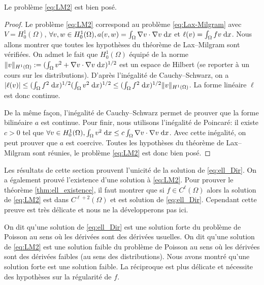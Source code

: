 \documentclass[12pt,a4paper,twoside]{article}
\begin{document}
\begin{proposition}
  Le probl\`eme \eqref{eq:LM2} est bien pos\'e.
\end{proposition}
\begin{proof}
  Le probl\`eme \eqref{eq:LM2} correspond au probl\`eme \eqref{eq:Lax-Milgram}
  avec $V = H_0^1(\Omega)$, 
  $\forall v, w \in H_0^1(\Omega), a(v,w) = \int_{\Omega} \nabla v \cdot \nabla v \;\mathrm{d} x$
  et $\ell(v) = \int_{\Omega} f v \;\mathrm{d} x$.
  Nous allons montrer que toutes les hypoth\`eses du th\'eor\`eme de Lax--Milgram
  sont v\'erifi\'ees.
  On admet le fait que $H_0^1(\Omega)$ \'equip\'e de la norme 
  $\| v \|_{H^1(\Omega)} := (\int_{\Omega} v^2 + \nabla v \cdot \nabla v \;\mathrm{d} x)^{1/2}$ 
  est un espace de Hilbert (se reporter \`a un cours sur les distributions).
  D'apr\`es l'in\'egalit\'e de Cauchy--Schwarz, on a 
  $|\ell(v)| \leq (\int_{\Omega} f^2 \;\mathrm{d} x)^{1/2} (\int_{\Omega} v^2 \;\mathrm{d} x)^{1/2}
  \leq (\int_{\Omega} f^2 \;\mathrm{d} x)^{1/2} \| v \|_{H^1(\Omega)}$.
  La forme lin\'eaire $\ell$ est donc continue. 
  
  
  De la m\^eme fa\c{c}on, l'in\'egalit\'e de Cauchy--Schwarz permet de prouver
  que la forme bilin\'eaire $a$ est continue.
  Pour finir, nous utilisons l'in\'egalit\'e de Poincar\'e: il existe $c>0$
  tel que $\forall v \in H_0^1(\Omega), 
  \int_{\Omega} v^2 \;\mathrm{d} x \leq c \int_{\Omega} \nabla v \cdot \nabla v \;\mathrm{d} x$.
  Avec cette in\'egalit\'e, on peut prouver que $a$ est coercive.
  Toutes les hypoth\`eses du th\'eor\`eme de Lax--Milgram sont r\'eunies,
  le probl\`eme \eqref{eq:LM2} est donc bien pos\'e.
\end{proof}

\begin{remark}
  Les r\'esultats de cette section prouvent l'unicit\'e de la solution
  de \eqref{eq:ell_Dir}. On a \'egalement prouv\'e l'existence d'une
  solution \`a \eqref{eq:LM2}. Pour prouver le th\'eor\`eme
  \ref{thm:ell_existence}, il faut montrer que si $f \in C^{\ell}(\Omega)$
  alors la solution de \eqref{eq:LM2} est dans $C^{\ell+2}(\Omega)$
  et est solution de \eqref{eq:ell_Dir}. Cependant cette preuve est 
  tr\`es d\'elicate et nous ne la d\'evelopperons pas ici.
\end{remark}


\begin{remark}
  On dit qu'une solution de \eqref{eq:ell_Dir}
  est une solution forte du probl\`eme de Poisson au sens
  o\`u les d\'eriv\'ees sont des d\'eriv\'ees usuelles.
  On dit qu'une solution de \eqref{eq:LM2} est une solution
  faible du probl\`eme de Poisson au sens o\`u les d\'eriv\'ees
  sont des d\'eriv\'ees faibles (au sens des distributions).
  Nous avons montr\'e qu'une solution forte est une solution faible.
  La r\'eciproque est plus d\'elicate et n\'ecessite des hypoth\`eses
  sur la r\'egularit\'e de $f$.
\end{remark}
\end{document}
